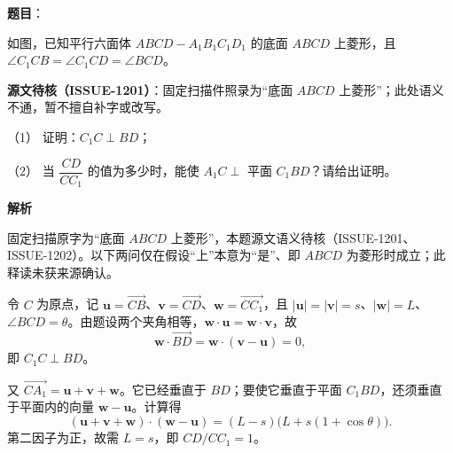 \begin{answer}

\textbf{题目}：

如图，已知平行六面体 $ABCD-A_1B_1C_1D_1$ 的底面 $ABCD$ 上菱形，且 $\angle C_1CB=\angle C_1CD=\angle BCD$。

\begin{gktip}
\textbf{源文待核（ISSUE-1201）}：固定扫描件照录为“底面 $ABCD$ 上菱形”；此处语义不通，暂不擅自补字或改写。
\end{gktip}

（1） 证明：$C_1C\perp BD$；

（2） 当 $\dfrac{CD}{CC_1}$ 的值为多少时，能使 $A_1C\perp$ 平面 $C_1BD$？请给出证明。
\nopagebreak[4]
\begin{center}\end{center}
\nopagebreak[4]
\textbf{解析}

固定扫描原字为“底面 $ABCD$ 上菱形”，本题源文语义待核（ISSUE-1201、ISSUE-1202）。以下两问仅在假设“上”本意为“是”、即 $ABCD$ 为菱形时成立；此释读未获来源确认。


令 $C$ 为原点，记 $\mathbf u=\overrightarrow{CB}$、$\mathbf v=\overrightarrow{CD}$、$\mathbf w=\overrightarrow{CC_1}$，且 $|\mathbf u|=|\mathbf v|=s$、$|\mathbf w|=L$、$\angle BCD=\theta$。由题设两个夹角相等，$\mathbf w\cdot\mathbf u=\mathbf w\cdot\mathbf v$，故
\nopagebreak[4]
\[
\mathbf w\cdot\overrightarrow{BD}=\mathbf w\cdot(\mathbf v-\mathbf u)=0,
\]
即 $C_1C\perp BD$。


又 $\overrightarrow{CA_1}=\mathbf u+\mathbf v+\mathbf w$。它已经垂直于 $BD$；要使它垂直于平面 $C_1BD$，还须垂直于平面内的向量 $\mathbf w-\mathbf u$。计算得
\nopagebreak[4]
\[
(\mathbf u+\mathbf v+\mathbf w)\cdot(\mathbf w-\mathbf u)
=(L-s)\bigl(L+s(1+\cos\theta)\bigr).
\]
第二因子为正，故需 $L=s$，即 $CD/CC_1=1$。



\end{answer}
